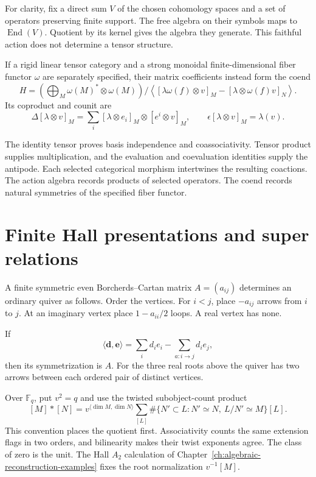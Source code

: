 For clarity, fix a direct sum \(V\) of the chosen cohomology
spaces and a set of operators preserving finite support.
The free algebra on their symbols maps to
\(\operatorname{End}(V)\). Quotient by its kernel gives the
algebra they generate.
This faithful action does not determine a tensor structure.

If a rigid linear tensor category and a strong monoidal
finite-dimensional fiber functor \(\omega\) are separately
specified, their matrix coefficients instead form the coend
\[
 H=\left(\bigoplus_M\omega(M)^*\otimes\omega(M)\right)
 \Big/
 \left\langle[\lambda\omega(f)\otimes v]_M
       -[\lambda\otimes\omega(f)v]_N\right\rangle.
\]
Its coproduct and counit are
\[
 \Delta[\lambda\otimes v]_M
   =\sum_i[\lambda\otimes e_i]_M\otimes[e^i\otimes v]_M,
 \qquad \epsilon[\lambda\otimes v]_M=\lambda(v).
\]

The identity tensor proves basis independence and
coassociativity. Tensor product supplies multiplication,
and the evaluation and coevaluation identities supply
the antipode. Each selected categorical morphism
intertwines the resulting coactions.
The action algebra records products of selected operators.
The coend records natural symmetries of the specified
fiber functor.

\section{Finite Hall presentations and super relations}

A finite symmetric even Borcherds--Cartan matrix
\(A=(a_{ij})\) determines an ordinary quiver as follows.
Order the vertices. For \(i<j\), place \(-a_{ij}\) arrows
from \(i\) to \(j\). At an imaginary vertex place
\(1-a_{ii}/2\) loops. A real vertex has none.

If
\[
 \langle\mathbf d,\mathbf e\rangle
     =\sum_i d_ie_i-\sum_{a:i\to j}d_ie_j,
\]
then its symmetrization is \(A\).
For the three real roots above the quiver has two arrows
between each ordered pair of distinct vertices.

Over \(\mathbb F_q\), put \(v^2=q\) and use the twisted
subobject-count product
\[
 [M]*[N]=v^{\langle\dim M,\dim N\rangle}
       \sum_{[L]}
       \#\{N'\subset L:N'\simeq N,\ L/N'\simeq M\}[L].
\]
This convention places the quotient first.
Associativity counts the same extension flags in two
orders, and bilinearity makes their twist exponents agree.
The class of zero is the unit.
The Hall \(A_2\) calculation of
Chapter~\ref{ch:algebraic-reconstruction-examples} fixes
the root normalization \(v^{-1}[M]\).

